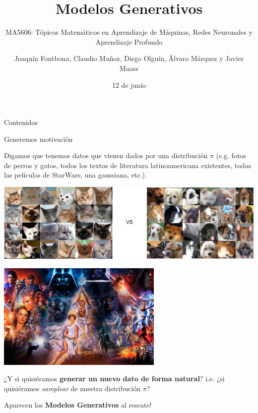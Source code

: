 \documentclass[aspectratio=169,xcolor=dvipsnames, t, spanish]{beamer}
\title[short title]{Modelos Generativos} %
\subtitle{MA5606: Tópicos Matemáticos en Aprendizaje de Máquinas, Redes Neuronales y Aprendizaje Profundo}
\author[Surname]{Joaquín Fontbona, Claudio Muñoz, Diego Olguín, Álvaro Márquez y Javier Maass}
\institute[DIM Universidad de Chile]{Departamento de Ingeniería Matemática \newline Universidad de Chile}
\date{12 de junio} %
\begin{document}
\maketitlepage

\begin{frame}[t]{Contenidos}
    \tableofcontents
\end{frame}



\begin{frame}{Generemos motivación}
\begin{center}
    Digamos que tenemos datos que vienen dados por una distribución $\pi$ (e.g. fotos de perros y gatos, todos los textos de literatura latinoamericana existentes, todas las películas de StarWars, una gaussiana, etc.).
    \vspace{2mm}

    \begin{minipage}{0.48\textwidth}
    \begin{center}
        \includegraphics[width=\textwidth]{figures/CatsDogs.png}
    \end{center}
    \end{minipage}\begin{minipage}{0.45\textwidth}
    \begin{center}
        \includegraphics[width=0.6\textwidth]{figures/Star-Wars-Day-2-web.jpg}
    \end{center}
    \end{minipage}\vspace{2mm}

    \pause

    ¿Y si quisiéramos \textbf{generar un nuevo dato de forma natural}? i.e. ¿si quisiéramos \textit{samplear} de nuestra distribución $\pi$?
    
    \pause
    
    Aparecen los \textbf{Modelos Generativos} al rescate!
\end{center}
\end{frame}
\end{document}
